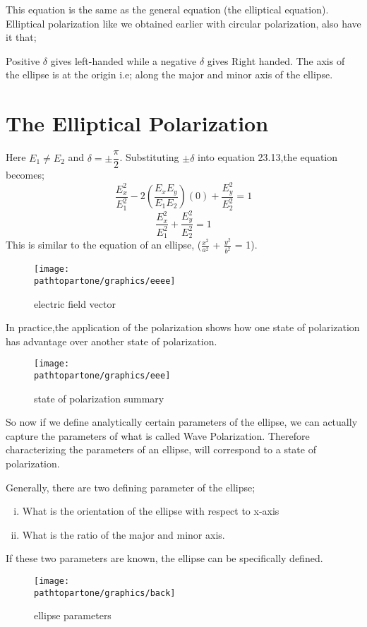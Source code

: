 This equation is the same as the general equation (the elliptical equation). Elliptical polarization like we obtained earlier with circular polarization, also have it that;

Positive $\delta$ gives left-handed while a negative $\delta$ gives Right handed. The axis of the ellipse is at the origin i.e; along the major and minor axis of the ellipse.

\section{The Elliptical Polarization}
Here $E_1\neq E_2$ and $\delta = \pm \dfrac{\pi}{2} $. Substituting $\pm \delta$ into equation 23.13,the equation becomes;
\begin{equation}
\frac{E_{x}^2}{E_{1}^2} -2(\frac{E_{x}E_{y}}{E_{1}E_{2}})(0) + \frac{E_{y}^2}{E_{2}^2} = 1
\end{equation}
\begin{equation}
\frac{E_{x}^2}{E_{1}^2} + \frac{E_{y}^2}{E_{2}^2} = 1
\end{equation}
This is similar to the equation of an ellipse, ($\frac{x^2}{a^2}$ + $\frac{y^2}{b^2}$ = 1).
\begin{figure}[h]
\centering
\texttt{[image: \\pathtopartone/graphics/eeee]}
\caption{electric field vector}
\end{figure}

In practice,the application of the polarization shows how one state of polarization has advantage over another state of polarization.
\begin{figure}[h]
\centering
\texttt{[image: \\pathtopartone/graphics/eee]}
\caption{state of polarization summary}
\end{figure}

So now if we define analytically certain parameters of the ellipse, we can actually capture the parameters of what is called Wave Polarization. Therefore characterizing the parameters of an ellipse, will correspond to a state of polarization.

Generally, there are two defining parameter of the ellipse;
\begin{enumerate}[(i)]
\item What is the orientation of the ellipse with respect to x-axis 
\item What is the ratio of the major and minor axis.
\end{enumerate}
If these two parameters are known, the ellipse can be specifically defined.
\begin{figure}[h]
\centering
\texttt{[image: \\pathtopartone/graphics/back]}
\caption{ellipse parameters}
\end{figure}

